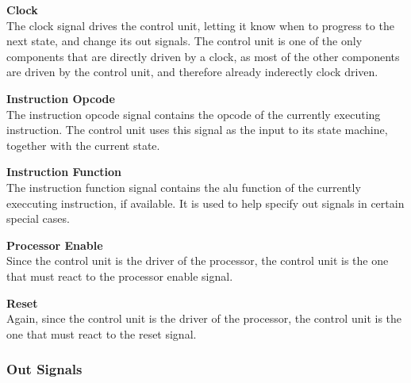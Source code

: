 \begin{description}
\item{\textbf{Clock}} \\
The clock signal drives the control unit, letting it know when to progress to the next state, and change its out signals.
The control unit is one of the only components that are directly driven by a clock, as most of the other components are driven by the control unit, and therefore already inderectly clock driven.

\item{\textbf{Instruction Opcode}} \\
The instruction opcode signal contains the opcode of the currently executing instruction.
The control unit uses this signal as the input to its state machine, together with the current state.

\item{\textbf{Instruction Function}} \\
The instruction function signal contains the alu function of the currently execcuting instruction, if available.
It is used to help specify out signals in certain special cases.

\item{\textbf{Processor Enable}} \\
Since the control unit is the driver of the processor, the control unit is the one that must react to the processor enable signal.

\item{\textbf{Reset}} \\
Again, since the control unit is the driver of the processor, the control unit is the one that must react to the reset signal.
\end{description}

\subsubsection{Out Signals}

